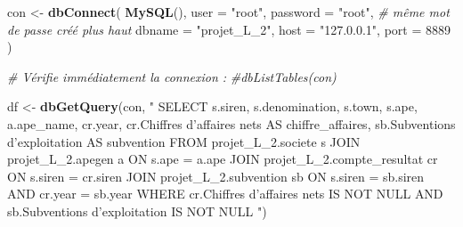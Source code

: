 \documentclass[mstat,12pt]{unswthesis}
\newenvironment{Shaded}{\begin{snugshade}}{\end{snugshade}}
\newcommand{\AttributeTok}[1]{\textcolor[rgb]{0.13,0.29,0.53}{#1}}
\newcommand{\CommentTok}[1]{\textcolor[rgb]{0.56,0.35,0.01}{\textit{#1}}}
\newcommand{\DecValTok}[1]{\textcolor[rgb]{0.00,0.00,0.81}{#1}}
\newcommand{\FunctionTok}[1]{\textcolor[rgb]{0.13,0.29,0.53}{\textbf{#1}}}
\newcommand{\NormalTok}[1]{#1}
\newcommand{\OtherTok}[1]{\textcolor[rgb]{0.56,0.35,0.01}{#1}}
\newcommand{\StringTok}[1]{\textcolor[rgb]{0.31,0.60,0.02}{#1}}
\begin{document}
\footnotesize

\begin{Shaded}
\begin{Highlighting}[]
\NormalTok{con }\OtherTok{\textless{}{-}} \FunctionTok{dbConnect}\NormalTok{(}
  \FunctionTok{MySQL}\NormalTok{(),}
  \AttributeTok{user =} \StringTok{"root"}\NormalTok{,}
  \AttributeTok{password =} \StringTok{"root"}\NormalTok{, }\CommentTok{\# même mot de passe créé plus haut}
  \AttributeTok{dbname =} \StringTok{"projet\_L\_2"}\NormalTok{,}
  \AttributeTok{host =} \StringTok{"127.0.0.1"}\NormalTok{,}
  \AttributeTok{port =} \DecValTok{8889}
\NormalTok{)}

\CommentTok{\# Vérifie immédiatement la connexion :}
\CommentTok{\#dbListTables(con)}

\NormalTok{df }\OtherTok{\textless{}{-}} \FunctionTok{dbGetQuery}\NormalTok{(con, }\StringTok{"}
\StringTok{SELECT}
\StringTok{    s.siren,}
\StringTok{    s.denomination,}
\StringTok{    s.town,}
\StringTok{    s.ape,}
\StringTok{    a.ape\_name,}
\StringTok{    cr.year,}
\StringTok{    cr.\textasciigrave{}Chiffres d’affaires nets\textasciigrave{} AS chiffre\_affaires,}
\StringTok{    sb.\textasciigrave{}Subventions d’exploitation\textasciigrave{} AS subvention}
\StringTok{FROM projet\_L\_2.societe s}
\StringTok{JOIN projet\_L\_2.apegen a}
\StringTok{  ON s.ape = a.ape}
\StringTok{JOIN projet\_L\_2.compte\_resultat cr}
\StringTok{  ON s.siren = cr.siren}
\StringTok{JOIN projet\_L\_2.subvention sb}
\StringTok{  ON s.siren = sb.siren AND cr.year = sb.year}
\StringTok{WHERE cr.\textasciigrave{}Chiffres d’affaires nets\textasciigrave{} IS NOT NULL}
\StringTok{  AND sb.\textasciigrave{}Subventions d’exploitation\textasciigrave{} IS NOT NULL}
\StringTok{"}\NormalTok{)}
\end{Highlighting}
\end{Shaded}

\normalsize

\newpage
\end{document}
